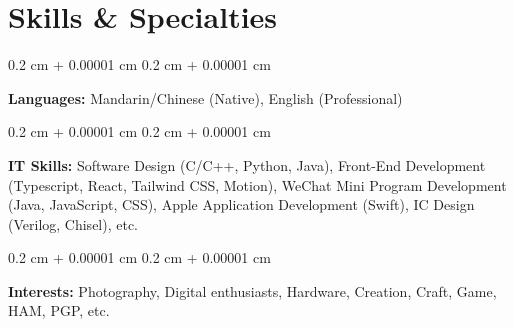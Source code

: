 \documentclass[10pt, letterpaper]{article}
\newenvironment{onecolentry}{
    \begin{adjustwidth}{
        0.2 cm + 0.00001 cm
    }{
        0.2 cm + 0.00001 cm
    }
}{
    \end{adjustwidth}
} %
\begin{document}
        
    \section{Skills \& Specialties}



        
        \begin{onecolentry}
            \textbf{Languages:} Mandarin/Chinese (Native), English (Professional)
        \end{onecolentry}

        \vspace{0.2 cm}

        \begin{onecolentry}
            \textbf{IT Skills:} Software Design (C/C++, Python, Java), Front-End Development (Typescript, React, Tailwind CSS, Motion), WeChat Mini Program Development (Java, JavaScript, CSS), Apple Application Development (Swift), IC Design (Verilog, Chisel), etc.
        \end{onecolentry}
            
        \vspace{0.2 cm}

        \begin{onecolentry}
            \textbf{Interests: }Photography, Digital enthusiasts, Hardware, Creation, Craft, Game, HAM, PGP, etc.
        \end{onecolentry}


    
\end{document}

